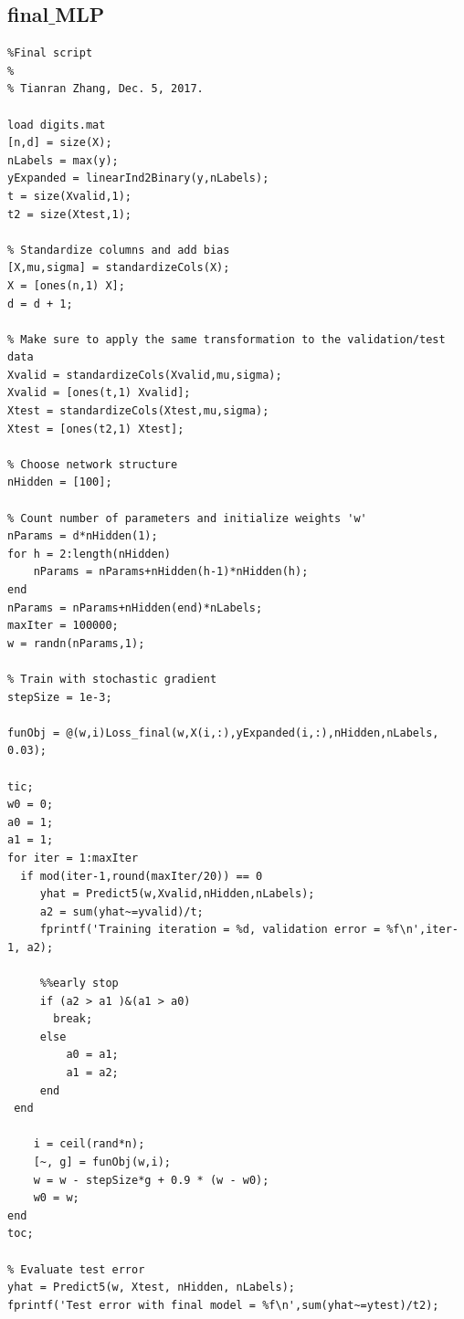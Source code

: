 \documentclass[12pt]{article}
\begin{document}
\subsection{final$\_$MLP}
\begin{lstlisting}
%Final script
%
% Tianran Zhang, Dec. 5, 2017.

load digits.mat
[n,d] = size(X);
nLabels = max(y);
yExpanded = linearInd2Binary(y,nLabels);
t = size(Xvalid,1);
t2 = size(Xtest,1);

% Standardize columns and add bias
[X,mu,sigma] = standardizeCols(X);
X = [ones(n,1) X];
d = d + 1;

% Make sure to apply the same transformation to the validation/test data
Xvalid = standardizeCols(Xvalid,mu,sigma);
Xvalid = [ones(t,1) Xvalid];
Xtest = standardizeCols(Xtest,mu,sigma);
Xtest = [ones(t2,1) Xtest];

% Choose network structure
nHidden = [100];

% Count number of parameters and initialize weights 'w'
nParams = d*nHidden(1);
for h = 2:length(nHidden)
    nParams = nParams+nHidden(h-1)*nHidden(h);
end
nParams = nParams+nHidden(end)*nLabels;
maxIter = 100000;
w = randn(nParams,1);

% Train with stochastic gradient
stepSize = 1e-3;

funObj = @(w,i)Loss_final(w,X(i,:),yExpanded(i,:),nHidden,nLabels, 0.03);

tic;
w0 = 0;
a0 = 1;
a1 = 1;
for iter = 1:maxIter    
  if mod(iter-1,round(maxIter/20)) == 0
     yhat = Predict5(w,Xvalid,nHidden,nLabels);
     a2 = sum(yhat~=yvalid)/t;
     fprintf('Training iteration = %d, validation error = %f\n',iter-1, a2);
      
     %%early stop       
     if (a2 > a1 )&(a1 > a0)           
       break;
     else
         a0 = a1;
         a1 = a2;
     end        
 end
    
    i = ceil(rand*n);
    [~, g] = funObj(w,i); 
    w = w - stepSize*g + 0.9 * (w - w0);
    w0 = w;
end
toc;

% Evaluate test error
yhat = Predict5(w, Xtest, nHidden, nLabels);
fprintf('Test error with final model = %f\n',sum(yhat~=ytest)/t2);

\end{lstlisting}
\end{document}
